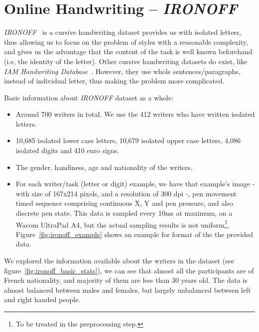 \clearpage

\section{Online Handwriting -- \textit{IRONOFF}}

\par \textit{IRONOFF}~\citep{791823} is a cursive handwriting dataset provides us with isolated letters, thus allowing us to focus on the problem of styles with a reasonable complexity, and gives us the advantage that the content of the task is well known beforehand (i.e, the identity of the letter). Other cursive handwriting datasets do exist, like \textit{IAM Handwriting Database}~\citep{marti1999full}. However, they use whole sentences/paragraphs, instead of individual letter, thus making the problem more complicated.

Basic information about \textit{IRONOFF} dataset as a whole:
\begin{itemize}[noitemsep]
    \item Around 700 writers in total. We use the 412 writers who have written isolated letters.
    \item 10,685 isolated lower case letters, 10,679 isolated upper case letters, 4,086 isolated digits and 410 euro signs.
    \item The gender, handiness, age and nationality of the writers.
    \item For each writer/task (letter or digit) example, we have that example's image - with size of 167x214 pixels, and a resolution of 300 dpi -, pen movement timed sequence comprising continuous X, Y and pen pressure, and also discrete pen state. This data is sampled every 10ms at maximum, on a Wacom UltraPad A4, but the actual sampling results is not uniform\footnote{To be treated in the preprocessing step.}. Figure~\ref{fig:ironoff_example} shows an example for format of the the provided data.
\end{itemize}

\par We explored the information available about the writers in the dataset (see figure~\ref{fig:ironoff_basic_stats}), we can see that almost all the participants are of French nationality, and majority of them are less than 30 years old. The data is almost balanced between males and females, but largely unbalanced between left and right handed people. %

